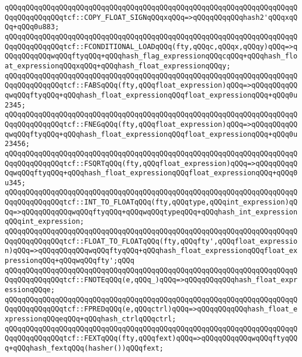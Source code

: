 \verb|qQQqqQQqqQQqqQQqqQQqqQQqqQQqqQQqqQQqqQQqqQQqqQQqqQQqqQQqqQQqqQQqqQQqqQQqqQQqqQQqqQQqtcf::COPY_FLOAT_SIGNqQQqxqQQq=>qQQqqQQqqQQqhash2'qQQqxqQQq+qQQq0u883;|\newline
\verb|qQQqqQQqqQQqqQQqqQQqqQQqqQQqqQQqqQQqqQQqqQQqqQQqqQQqqQQqqQQqqQQqqQQqqQQqqQQqqQQqqQQqtcf::FCONDITIONAL_LOADqQQq(fty,qQQqc,qQQqx,qQQqy)qQQq=>qQQqqQQqqQQqwqQQqftyqQQq+qQQqhash_flag_expressionqQQqcqQQq+qQQqhash_float_expressionqQQqxqQQq+qQQqhash_float_expressionqQQqy;|\newline
\verb|qQQqqQQqqQQqqQQqqQQqqQQqqQQqqQQqqQQqqQQqqQQqqQQqqQQqqQQqqQQqqQQqqQQqqQQqqQQqqQQqqQQqtcf::FABSqQQq(fty,qQQqfloat_expression)qQQq=>qQQqqQQqqQQqwqQQqftyqQQq+qQQqhash_float_expressionqQQqfloat_expressionqQQq+qQQq0u2345;|\newline
\verb|qQQqqQQqqQQqqQQqqQQqqQQqqQQqqQQqqQQqqQQqqQQqqQQqqQQqqQQqqQQqqQQqqQQqqQQqqQQqqQQqqQQqtcf::FNEGqQQq(fty,qQQqfloat_expression)qQQq=>qQQqqQQqqQQqwqQQqftyqQQq+qQQqhash_float_expressionqQQqfloat_expressionqQQq+qQQq0u23456;|\newline
\verb|qQQqqQQqqQQqqQQqqQQqqQQqqQQqqQQqqQQqqQQqqQQqqQQqqQQqqQQqqQQqqQQqqQQqqQQqqQQqqQQqqQQqtcf::FSQRTqQQq(fty,qQQqfloat_expression)qQQq=>qQQqqQQqqQQqwqQQqftyqQQq+qQQqhash_float_expressionqQQqfloat_expressionqQQq+qQQq0u345;|\newline
\verb|qQQqqQQqqQQqqQQqqQQqqQQqqQQqqQQqqQQqqQQqqQQqqQQqqQQqqQQqqQQqqQQqqQQqqQQqqQQqqQQqqQQqtcf::INT_TO_FLOATqQQq(fty,qQQqtype,qQQqint_expression)qQQq=>qQQqqQQqqQQqwqQQqftyqQQq+qQQqwqQQqtypeqQQq+qQQqhash_int_expressionqQQqint_expression;|\newline
\verb|qQQqqQQqqQQqqQQqqQQqqQQqqQQqqQQqqQQqqQQqqQQqqQQqqQQqqQQqqQQqqQQqqQQqqQQqqQQqqQQqqQQqtcf::FLOAT_TO_FLOATqQQq(fty,qQQqfty',qQQqfloat_expression)qQQq=>qQQqqQQqqQQqwqQQqftyqQQq+qQQqhash_float_expressionqQQqfloat_expressionqQQq+qQQqwqQQqfty';qQQq|\newline
\verb|qQQqqQQqqQQqqQQqqQQqqQQqqQQqqQQqqQQqqQQqqQQqqQQqqQQqqQQqqQQqqQQqqQQqqQQqqQQqqQQqqQQqtcf::FNOTEqQQq(e,qQQq_)qQQq=>qQQqqQQqqQQqhash_float_expressionqQQqe;|\newline
\verb|qQQqqQQqqQQqqQQqqQQqqQQqqQQqqQQqqQQqqQQqqQQqqQQqqQQqqQQqqQQqqQQqqQQqqQQqqQQqqQQqqQQqtcf::FPREDqQQq(e,qQQqctrl)qQQq=>qQQqqQQqqQQqhash_float_expressionqQQqeqQQq+qQQqhash_ctrlqQQqctrl;|\newline
\verb|qQQqqQQqqQQqqQQqqQQqqQQqqQQqqQQqqQQqqQQqqQQqqQQqqQQqqQQqqQQqqQQqqQQqqQQqqQQqqQQqqQQqtcf::FEXTqQQq(fty,qQQqfext)qQQq=>qQQqqQQqqQQqwqQQqftyqQQq+qQQqhash_fextqQQq(hasher())qQQqfext;|\newline
